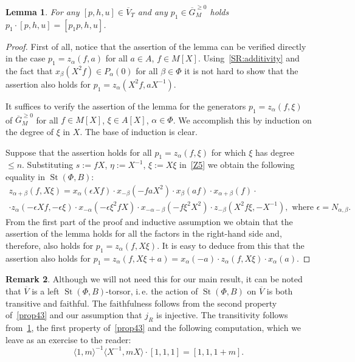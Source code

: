 \documentclass[oneside, 8pt]{amsart}
\newtheorem{lemma}{Lemma}
\theoremstyle{remark}
\theoremstyle{definition}
\numberwithin{lemma}{section}
\numberwithin{prop}{section}
\numberwithin{corollary}{section}
\numberwithin{externaltheorem}{section}
\newtheorem{rem}[lemma]{Remark}
\DeclareMathOperator{\St}{St}
\numberwithin{equation}{section}
\begin{document}
\begin{lemma}\label{lem:action} For any $[p, h, u]\in \overline{V}_T$ and any $p_1 \in \overline{G}^{\geq 0}_M$ holds $p_1 \cdot [p, h, u] = [p_1p, h, u]$. \end{lemma}
\begin{proof} First of all, notice that the assertion of the lemma can be verified directly in the case $p_1 = z_\alpha(f, a)$ for all $a\in A$, $f\in M[X]$. Using~\cref{SR:additivity} and the fact that $x_\beta(X^2f) \in P_\alpha(0)$ for all $\beta \in \Phi$ it is not hard to show that the assertion also holds for $p_1 = z_\alpha(X^2f, aX^{-1})$.

It suffices to verify the assertion of the lemma for the generators $p_1 = z_\alpha(f, \xi)$ of $\overline{G}_M^{\geq 0}$ for all $f \in M[X]$, $\xi\in A[X]$, $\alpha \in \Phi$. We accomplish this by 
induction on the degree of $\xi$ in $X$. The base of induction is clear.

Suppose that the assertion holds for all $p_1 = z_\alpha(f, \xi)$ for which $\xi$ has degree $\leq n$.
Substituting $s := fX$, $\eta := X^{-1}$, $\xi := X\xi$ in~\eqref{Z5} we obtain the following equality in $\St(\Phi, B)$:
\begin{multline*}
 z_{\alpha+\beta}(f, X\xi) = x_\alpha(\epsilon Xf) \cdot x_{-\beta}(-faX^2) \cdot x_{\beta}(af) \cdot x_{\alpha+\beta}(f) \cdot \\ \cdot z_\alpha(-\epsilon Xf, -\epsilon \xi) \cdot x_{-\alpha}(-\epsilon \xi^2fX) \cdot x_{-\alpha-\beta}(- f \xi^2X^2) \cdot z_{-\beta}(X^2f\xi, -X^{-1}),\text{ where $\epsilon = N_{\alpha, \beta}$.}
\end{multline*}
From the first part of the proof and inductive assumption we obtain that the assertion of the lemma holds for all the factors in the right-hand side and, therefore, also holds  for $p_1 = z_\alpha(f, X\xi)$. It is easy to deduce from this that the assertion also holds for $p_1 = z_\alpha(f, X\xi + a) = x_\alpha(-a) \cdot z_\alpha(f, X\xi) \cdot x_\alpha(a)$. 
\end{proof}

\begin{rem}
Although we will not need this for our main result, it can be noted that $\overline{V}$ is a left $\St(\Phi, B)$-torsor, i.\,e. the action of $\St(\Phi, B)$ on $\overline{V}$ is both transitive and faithful. The faithfulness follows from the second property of~\cref{prop43} and our assumption that $j_R$ is injective.
The transitivity follows from~\cref{lem:action}, the first property of~\cref{prop43} and the following computation, which we leave as an exercise to the reader:
\begin{equation*} \langle 1, m \rangle^{-1} \langle X^{-1}, mX \rangle \cdot [1, 1, 1] = [1, 1, 1+m]. \end{equation*} \end{rem}
\end{document}
